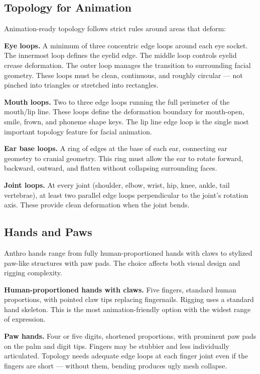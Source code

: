 \subsection{Topology for Animation}
\label{subsec:topology-animation}

Animation-ready topology follows strict rules around areas that deform:

\textbf{Eye loops.} A minimum of three concentric edge loops around each eye socket. The innermost loop defines the eyelid edge. The middle loop controls eyelid crease deformation. The outer loop manages the transition to surrounding facial geometry. These loops must be clean, continuous, and roughly circular --- not pinched into triangles or stretched into rectangles.

\textbf{Mouth loops.} Two to three edge loops running the full perimeter of the mouth/lip line. These loops define the deformation boundary for mouth-open, smile, frown, and phoneme shape keys. The lip line edge loop is the single most important topology feature for facial animation.

\textbf{Ear base loops.} A ring of edges at the base of each ear, connecting ear geometry to cranial geometry. This ring must allow the ear to rotate forward, backward, outward, and flatten without collapsing surrounding faces.

\textbf{Joint loops.} At every joint (shoulder, elbow, wrist, hip, knee, ankle, tail vertebrae), at least two parallel edge loops perpendicular to the joint's rotation axis. These provide clean deformation when the joint bends.


\subsection{Hands and Paws}

Anthro hands range from fully human-proportioned hands with claws to stylized paw-like structures with paw pads. The choice affects both visual design and rigging complexity.

\textbf{Human-proportioned hands with claws.} Five fingers, standard human proportions, with pointed claw tips replacing fingernails. Rigging uses a standard hand skeleton. This is the most animation-friendly option with the widest range of expression.

\textbf{Paw hands.} Four or five digits, shortened proportions, with prominent paw pads on the palm and digit tips. Fingers may be stubbier and less individually articulated. Topology needs adequate edge loops at each finger joint even if the fingers are short --- without them, bending produces ugly mesh collapse.

